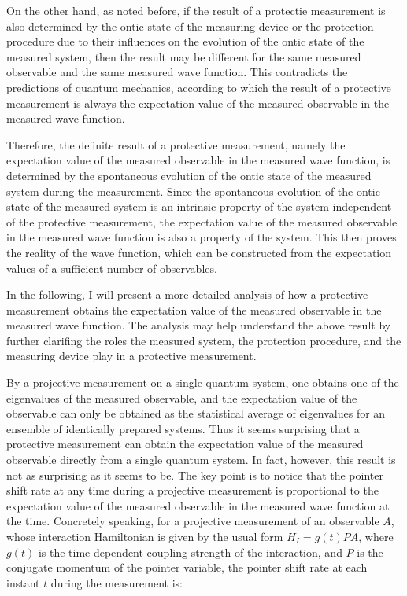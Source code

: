 On the other hand, as noted before, if the result of a protectie measurement is also determined by the ontic state of the measuring device or the protection procedure due to their influences on the evolution of the ontic state of the measured system, then the result may be different for the same measured observable and the same measured wave function. This  contradicts the predictions of quantum mechanics, according to which the result of a protective measurement is always the expectation value of the measured observable in the measured wave function. 

Therefore, the definite result of a protective measurement, namely the expectation value of the measured observable in the measured wave function, is determined by the spontaneous evolution of the ontic state of the measured system during the measurement. Since the spontaneous evolution of the ontic state of the measured system is an intrinsic property of the system independent of the protective measurement, the expectation value of the measured observable in the measured wave function is also a property of the system. This then proves the reality of the wave function, which can be constructed from the expectation values of a sufficient number of observables.

In the following, I will present a more detailed analysis of how a protective measurement obtains the expectation value of the measured observable in the measured wave function. 
The analysis may help understand the above result by further clarifing the roles the measured system, the protection procedure, and the measuring device play in a protective measurement. 

By a projective measurement on a single quantum system, one obtains one of the eigenvalues of the measured observable, and the expectation value of the observable can only be obtained as the statistical average of eigenvalues for an ensemble of identically prepared systems. 
Thus it seems surprising that a protective measurement can obtain the expectation value of the measured observable directly from a single quantum system. 
In fact, however, this result is not as surprising as it seems to be. 
The key point is to notice that the pointer shift rate at any time during a projective measurement is proportional to the expectation value of the measured observable in the measured wave function at the time. Concretely speaking, for a projective measurement of an observable $A$, whose interaction Hamiltonian is given by the usual form $H_I = g(t)PA$, where $g(t)$ is the time-dependent coupling strength of the interaction, and $P$ is the conjugate momentum of the pointer variable, the pointer shift rate at each instant $t$ during the measurement is:

